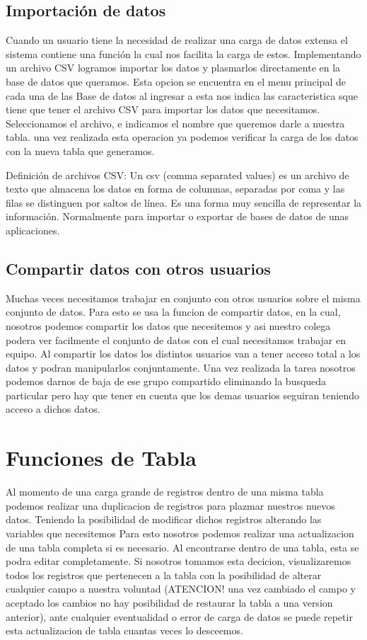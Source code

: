 \documentclass[a4paper,10pt]{article}
\begin{document}
\subsection{Importación de datos}
Cuando un usuario tiene la necesidad de realizar una carga de datos extensa el sistema contiene una función la cual nos facilita la carga de estos. Implementando un archivo CSV logramos importar los datos y plasmarlos directamente en la base de datos que queramos.
Esta opcion se encuentra en el menu principal de cada una de las Base de datos  al ingresar a esta nos indica las caracteristica sque tiene que tener el archivo CSV para importar los datos que necesitamos. Seleccionamos el archivo, e indicamos el nombre que queremos darle a nuestra tabla. una vez realizada esta operacion ya podemos verificar la carga de los datos con la nueva tabla que generamos.

Definición de archivos CSV: Un csv (comma separated values) es un archivo de texto que almacena los datos en forma de columnas, separadas por coma y las filas se distinguen por saltos de línea. Es una forma muy sencilla de representar la información. Normalmente para importar o exportar de bases de datos de unas aplicaciones.


\subsection{Compartir datos con otros usuarios}
Muchas veces necesitamos trabajar en conjunto con otros usuarios sobre el misma conjunto de datos. Para esto se usa la funcion de compartir datos, en la cual, nosotros podemos compartir los datos que necesitemos y asi nuestro colega podera ver facilmente el conjunto de datos con el cual necesitamos trabajar en equipo. Al compartir los datos los distintos usuarios van a tener acceso total a los datos y podran manipularlos conjuntamente.
Una vez realizada la tarea nosotros podemos darnos de baja de ese grupo compartido eliminando la busqueda particular pero hay que tener en cuenta que los demas usuarios seguiran teniendo acceso a dichos datos.


\section{Funciones de Tabla}
Al momento de una carga grande de registros dentro de una misma tabla podemos realizar una duplicacion de registros para plazmar nuestros nuevos datos. Teniendo la posibilidad de modificar dichos registros alterando las variables que necesitemos
Para esto nosotros podemos realizar una actualizacion de una tabla completa si es necesario. Al encontrarse dentro de una tabla, esta se podra editar completamente. Si nosotros tomamos esta decicion, visualizaremos todos los registros que pertenecen a la tabla con la posibilidad de alterar cualquier campo a nuestra voluntad (ATENCION! una vez cambiado el campo y aceptado los cambios no hay posibilidad de restaurar la tabla a una version anterior), ante cualquier eventualidad o error de carga de datos se puede repetir esta actualizacion de tabla cuantas veces lo desceemos.
\end{document}
